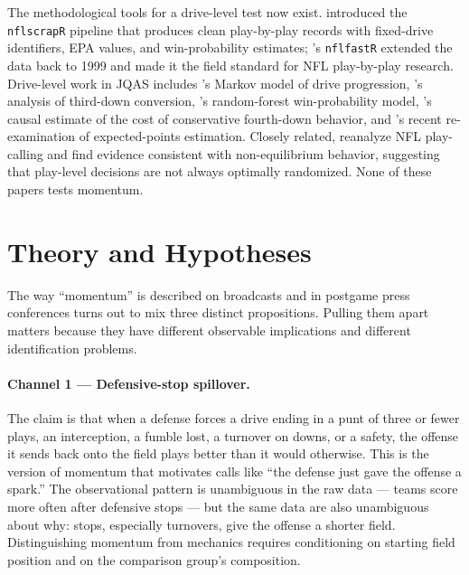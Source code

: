 \documentclass[11pt]{article}
\begin{document}
The methodological tools for a drive-level test now exist.
\citet{yurko2018nflwar} introduced the \texttt{nflscrapR} pipeline that
produces clean play-by-play records with fixed-drive identifiers, EPA values,
and win-probability estimates; \citet{nflfastr2024}'s \texttt{nflfastR}
extended the data back to 1999 and made it the field standard for NFL
play-by-play research. Drive-level work in JQAS includes
\citet{goldner2012markov}'s Markov model of drive progression,
\citet{cafarelli2012third}'s analysis of third-down conversion,
\citet{lock2014random}'s random-forest win-probability model,
\citet{yam2019what}'s causal estimate of the cost of conservative fourth-down
behavior, and \citet{brill2024expected}'s recent re-examination of
expected-points estimation. Closely related, \citet{kovash2009professional}
reanalyze NFL play-calling and find evidence consistent with non-equilibrium
behavior, suggesting that play-level decisions are not always optimally
randomized. None of these papers tests momentum.

\section{Theory and Hypotheses}\label{sec:theory}

The way ``momentum'' is described on broadcasts and in postgame press
conferences turns out to mix three distinct propositions. Pulling them apart
matters because they have different observable implications and different
identification problems.

\paragraph{Channel 1 --- Defensive-stop spillover.} The claim is that when
a defense forces a drive ending in a punt of three or fewer plays, an
interception, a fumble lost, a turnover on downs, or a safety, the offense
it sends back onto the field plays better than it would otherwise. This is
the version of momentum that motivates calls like ``the defense just gave the
offense a spark.'' The observational pattern is unambiguous in the raw data
--- teams score more often after defensive stops --- but the same data are
also unambiguous about why: stops, especially turnovers, give the offense a
shorter field. Distinguishing momentum from mechanics requires conditioning
on starting field position and on the comparison group's composition.
\end{document}
